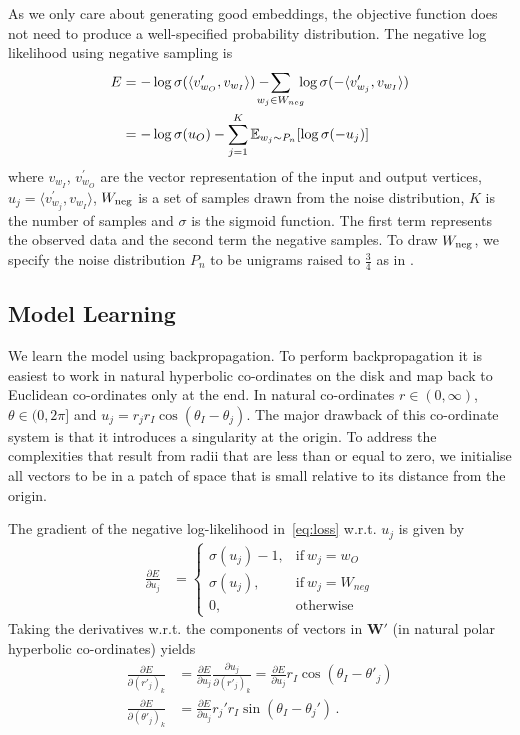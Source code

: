 \documentclass[sigconf, review]{acmart}
\begin{document}
As we only care about generating good embeddings, the objective function does not need to produce a well-specified probability distribution. The negative log likelihood using negative sampling is 
\begin{align}
E &= -\log \sigma (\langle v_{w_O}', v_{w_I} \rangle) -\hspace{-4mm} \sum_{w_j \in W_{neg}}\hspace{-2mm} \log \sigma(- \langle v_{w_j}', v_{w_I} \rangle) \\
&= -\log \sigma (u_O) - \sum_{j=1}^K \mathbb{E}_{w_j \sim P_n} [\log \sigma(- u_j)] 
\label{eq:loss}
\end{align}
where $v_{w_I}$, $v_{w_O}^\prime$ are the vector representation of the input and output vertices, $u_j = \langle v_{w_j}^\prime, v_{w_I}\rangle$, $W_{\rm neg}$ is a set of samples drawn from the noise distribution, $K$ is the number of samples and $\sigma$ is the sigmoid function. The first term represents the observed data and the second term the negative samples. To draw $W_{\rm neg}$, we specify the noise distribution $P_n$ to be unigrams raised to $\frac{3}{4}$ as in \cite{Mikolov2013}.

\subsection{Model Learning}

We learn the model using backpropagation. To perform backpropagation it is easiest to work in natural hyperbolic co-ordinates on the disk and map back to Euclidean co-ordinates only at the end. In natural co-ordinates $r \in (0,\infty)$, $\theta \in (0,2\pi]$ and $u_j = r_j r_I \cos(\theta_I - \theta_j)$. The major drawback of this co-ordinate system is that it introduces a singularity at the origin. To address the complexities that result from radii that are less than or equal to zero, we initialise all vectors to be in a patch of space that is small relative to its distance from the origin.

 The gradient of the negative log-likelihood in~\eqref{eq:loss} w.r.t. $u_j$ is given by
\begin{align}
\frac{\partial E}{\partial u_j} &= 
\begin{cases}
\sigma(u_j) - 1, & \text{if}\ w_j = w_O\\ 
\sigma(u_j), & \text{if}\ w_j = W_{neg}\\ 
0, & \text{otherwise}
\end{cases} 
\label{eq:error}
\end{align}
Taking the derivatives w.r.t. the components of vectors in $\mathbf{W'}$ (in natural polar hyperbolic co-ordinates)  yields
\begin{align}
\frac{\partial E}{\partial (r'_j)_k} &= \frac{\partial E}{\partial u_j}\frac{\partial u_j}{\partial (r'_j)_k} = \frac{\partial E}{\partial u_j} r_I \cos(\theta_I - \theta'_j) \\
\frac{\partial E}{\partial (\theta'_j)_k} & = \frac{\partial E}{\partial u_j} r_j'r_I \sin(\theta_I - \theta_j') \,.
\end{align}
\end{document}

